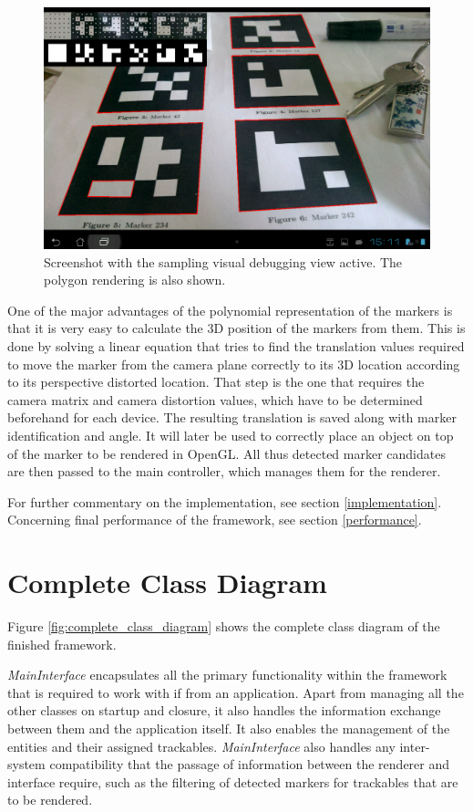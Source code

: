 \begin{figure}[H]
	\centering
	\includegraphics[width=14cm]{img/sampling.png}
	\caption[Marker Sampling]{Screenshot with the sampling visual debugging view active. The polygon rendering is also shown.}
	\label{fig:sampling}
\end{figure}

One of the major advantages of the polynomial representation of the markers is that it is very easy to calculate the 3D position of the markers from them.
This is done by solving a linear equation that tries to find the translation values required to move the marker from the camera plane correctly to its 3D location according to its perspective distorted location.
That step is the one that requires the camera matrix and camera distortion values, which have to be determined beforehand for each device.
The resulting translation is saved along with marker identification and angle.
It will later be used to correctly place an object on top of the marker to be rendered in OpenGL.
All thus detected marker candidates are then passed to the main controller, which manages them for the renderer.

For further commentary on the implementation, see section \ref{implementation}.
Concerning final performance of the framework, see section \ref{performance}.

\newpage
\section{Complete Class Diagram}
\label{complete_class}

Figure \ref{fig:complete_class_diagram} shows the complete class diagram of the finished framework.

\textit{MainInterface} encapsulates all the primary functionality within the framework that is required to work with if from an application.
Apart from managing all the other classes on startup and closure, it also handles the information exchange between them and the application itself.
It also enables the management of the entities and their assigned trackables.
\textit{MainInterface} also handles any inter-system compatibility that the passage of information between the renderer and interface require, such as the filtering of detected markers for trackables that are to be rendered.

